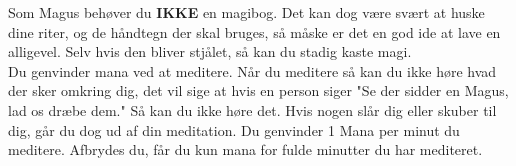 Som Magus behøver du \textbf{IKKE} en magibog. Det kan dog være svært at huske dine riter, og de håndtegn der skal bruges, så måske er det en god ide at lave en alligevel. Selv hvis den bliver stjålet, så kan du stadig kaste magi.\\

Du genvinder mana ved at meditere. Når du meditere så kan du ikke høre hvad der sker omkring dig, det vil sige at hvis en person siger "Se der sidder en Magus, lad os dræbe dem." Så kan du ikke høre det. Hvis nogen slår dig eller skuber til dig, går du dog ud af din meditation. Du genvinder 1 Mana per minut du meditere. Afbrydes du, får du kun mana for fulde minutter du har mediteret.\\